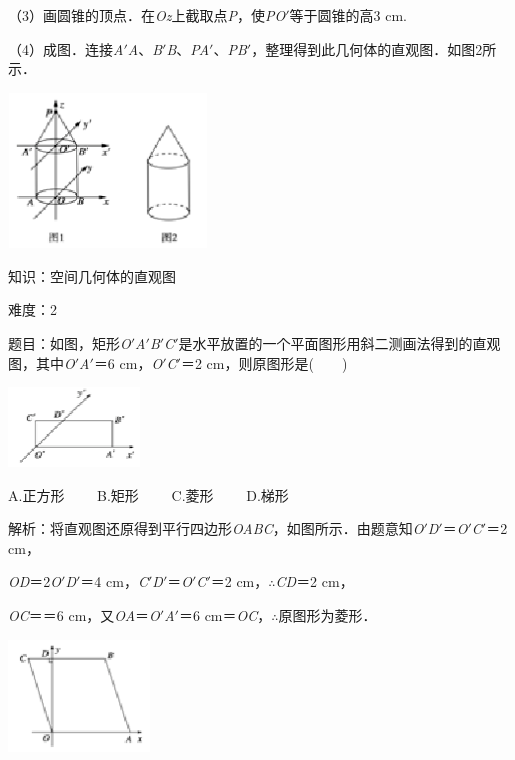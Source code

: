 \documentclass{article} %
\begin{document}
（3）画圆锥的顶点．在\textit{Oz}上截取点\textit{P}，使\textit{PO}$'$等于圆锥的高3 cm.

（4）成图．连接\textit{A}$'$\textit{A}、\textit{B}$'$\textit{B}、\textit{PA}$'$、\textit{PB}$'$，整理得到此几何体的直观图．如图2所示．

\includegraphics*[width=2.08in, height=1.62in, keepaspectratio=false]{image51}

知识：空间几何体的直观图

难度：2

题目：如图，矩形\textit{O}$'$\textit{A}$'$\textit{B}$'$\textit{C}$'$是水平放置的一个平面图形用斜二测画法得到的直观图，其中\textit{O}$'$\textit{A}$'$＝6 cm，\textit{O}$'$\textit{C}$'$＝2 cm，则原图形是(　　)

\includegraphics*[width=1.38in, height=0.83in, keepaspectratio=false]{image52}

A.正方形　　 B.矩形　　 C.菱形　　 D.梯形

解析：将直观图还原得到平行四边形\textit{OABC}，如图所示．由题意知\textit{O}$'$\textit{D}$'$＝\textit{O}$'$\textit{C}$'$＝2 cm，

\textit{OD}＝2\textit{O}$'$\textit{D}$'$＝4 cm，\textit{C}$'$\textit{D}$'$＝\textit{O}$'$\textit{C}$'$＝2 cm，$\mathrm{\therefore}$\textit{CD}＝2 cm，

\textit{OC}＝＝6 cm，又\textit{OA}＝\textit{O}$'$\textit{A}$'$＝6 cm＝\textit{OC}，$\mathrm{\therefore}$原图形为菱形．

\includegraphics*[width=1.48in, height=1.17in, keepaspectratio=false]{image53}
\end{document}
